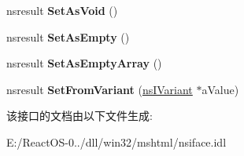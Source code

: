 \begin{DoxyCompactItemize}
\item 
\mbox{\label{interfacens_i_writable_variant_a01e884ac209d19c4f065effc6ee4359e}} 
nsresult {\bfseries Set\+As\+Void} ()
\item 
\mbox{\label{interfacens_i_writable_variant_a79e248db4f22fbe670b93898fd81180a}} 
nsresult {\bfseries Set\+As\+Empty} ()
\item 
\mbox{\label{interfacens_i_writable_variant_a235778329d64bb80b81100d32eeb0c48}} 
nsresult {\bfseries Set\+As\+Empty\+Array} ()
\item 
\mbox{\label{interfacens_i_writable_variant_a5068897a90ba27058e012adf60e5d598}} 
nsresult {\bfseries Set\+From\+Variant} (\hyperlink{interfacens_i_variant}{ns\+I\+Variant} $\ast$a\+Value)
\end{DoxyCompactItemize}


该接口的文档由以下文件生成\+:\begin{DoxyCompactItemize}
\item 
E\+:/\+React\+O\+S-\/0../dll/win32/mshtml/nsiface.\+idl\end{DoxyCompactItemize}
